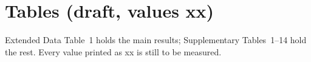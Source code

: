 
\newcommand{\xx}{xx}
\newcommand{\msd}{xx $\pm$ xx}
\newcommand{\ci}{xx (xx to xx)}
\newcommand{\grouprow}[2]{\multicolumn{#1}{@{}l}{\textit{#2}}\\}

\section*{Tables (draft, values xx)}

Extended Data Table~1 holds the main results; Supplementary Tables~1--14 hold the rest. Every value
printed as xx is still to be measured.

\renewcommand{\tablename}{Extended Data Table}
\setcounter{table}{0}


